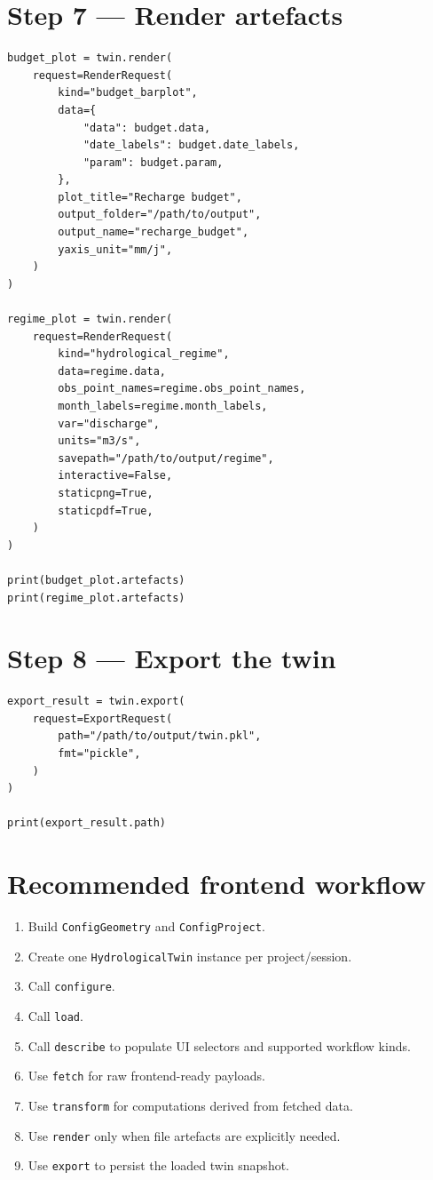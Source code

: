 \documentclass[11pt]{article}
\begin{document}
\section{Step 7 --- Render artefacts}

\begin{verbatim}
budget_plot = twin.render(
    request=RenderRequest(
        kind="budget_barplot",
        data={
            "data": budget.data,
            "date_labels": budget.date_labels,
            "param": budget.param,
        },
        plot_title="Recharge budget",
        output_folder="/path/to/output",
        output_name="recharge_budget",
        yaxis_unit="mm/j",
    )
)

regime_plot = twin.render(
    request=RenderRequest(
        kind="hydrological_regime",
        data=regime.data,
        obs_point_names=regime.obs_point_names,
        month_labels=regime.month_labels,
        var="discharge",
        units="m3/s",
        savepath="/path/to/output/regime",
        interactive=False,
        staticpng=True,
        staticpdf=True,
    )
)

print(budget_plot.artefacts)
print(regime_plot.artefacts)
\end{verbatim}

\section{Step 8 --- Export the twin}

\begin{verbatim}
export_result = twin.export(
    request=ExportRequest(
        path="/path/to/output/twin.pkl",
        fmt="pickle",
    )
)

print(export_result.path)
\end{verbatim}

\section{Recommended frontend workflow}

\begin{enumerate}
    \item Build \texttt{ConfigGeometry} and \texttt{ConfigProject}.
    \item Create one \texttt{HydrologicalTwin} instance per project/session.
    \item Call \texttt{configure}.
    \item Call \texttt{load}.
    \item Call \texttt{describe} to populate UI selectors and supported workflow kinds.
    \item Use \texttt{fetch} for raw frontend-ready payloads.
    \item Use \texttt{transform} for computations derived from fetched data.
    \item Use \texttt{render} only when file artefacts are explicitly needed.
    \item Use \texttt{export} to persist the loaded twin snapshot.
\end{enumerate}
\end{document}
